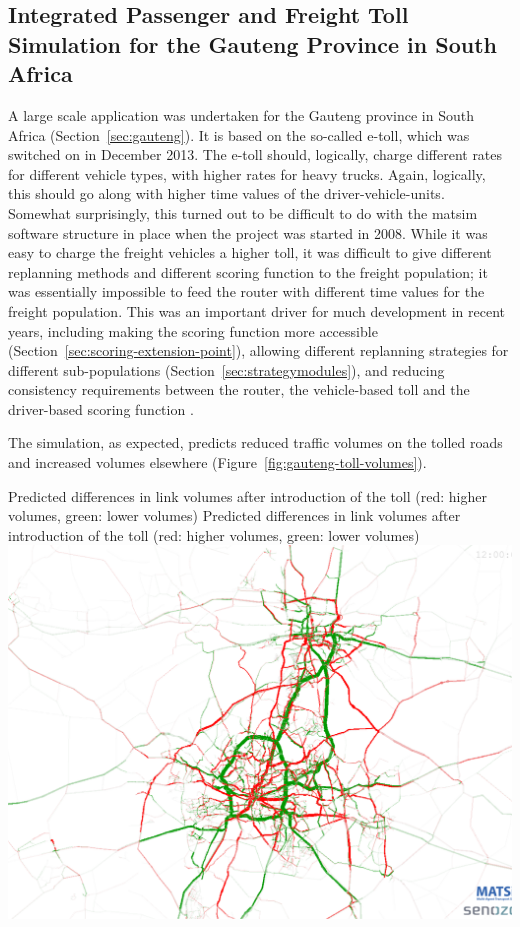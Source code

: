 \subsection{Integrated Passenger and Freight Toll Simulation for the Gauteng Province in South Africa}
A large scale application was undertaken for the Gauteng province in South Africa (Section~\ref{sec:gauteng}). It is based on the so-called e-toll, which was switched on in December 2013. The e-toll should, logically, charge different rates for different vehicle types, with higher rates for heavy trucks. Again, logically, this should go along with higher time values of the driver-vehicle-units.  Somewhat surprisingly, this turned out to be difficult to do with the \gls{matsim} software structure in place when the project was started in 2008. While it was easy to charge the freight vehicles a higher toll, it was difficult to give different replanning methods and different scoring function to the freight population; it was essentially impossible to feed the router with different time values for the freight population. This was an important driver for much development in recent years, including making the scoring function more accessible (Section~\ref{sec:scoring-extension-point}), allowing different replanning strategies for different sub-populations (Section~\ref{sec:strategymodules}), and reducing consistency requirements between the router, the vehicle-based toll and the driver-based scoring function \citep{NagelKickhoeferJoubert2014HeterogeneousVoTsPROCEDIA}.

The simulation, as expected, predicts reduced traffic volumes on the tolled roads and increased volumes elsewhere (Figure~\ref{fig:gauteng-toll-volumes}).

\createfigure%
{ Predicted differences in link volumes after introduction of the toll (red: higher volumes, green: lower volumes)}%
{ Predicted differences in link volumes after introduction of the toll (red: higher volumes, green: lower volumes)}%
{\label{fig:gauteng-toll-volumes}}%
{\includegraphics[width=0.8\hsize,trim=0 0 0 0,clip]{extending/figures/roadpricing/abs-diff-link-vol-vot55-24h.png}}%
{}

